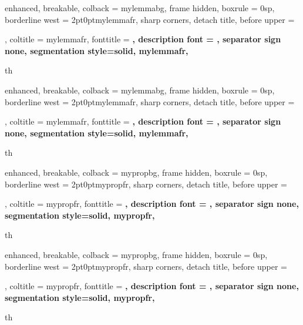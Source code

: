 

{%
	enhanced,
	breakable,
	colback = mylemmabg,
	frame hidden,
	boxrule = 0sp,
	borderline west = {2pt}{0pt}{mylemmafr},
	sharp corners,
	detach title,
	before upper = \tcbtitle \par \smallskip,
	coltitle = mylemmafr,
	fonttitle = \bfseries \sffamily,
	description font = \mdseries,
	separator sign none,
	segmentation style={solid, mylemmafr},
}
{th}

{%
	enhanced,
	breakable,
	colback = mylemmabg,
	frame hidden,
	boxrule = 0sp,
	borderline west = {2pt}{0pt}{mylemmafr},
	sharp corners,
	detach title,
	before upper = \tcbtitle \par \smallskip,
	coltitle = mylemmafr,
	fonttitle = \bfseries \sffamily,
	description font = \mdseries,
	separator sign none,
	segmentation style={solid, mylemmafr},
}
{th}



{%
	enhanced,
	breakable,
	colback = mypropbg,
	frame hidden,
	boxrule = 0sp,
	borderline west = {2pt}{0pt}{mypropfr},
	sharp corners,
	detach title,
	before upper = \tcbtitle \par \smallskip,
	coltitle = mypropfr,
	fonttitle = \bfseries \sffamily,
	description font = \mdseries,
	separator sign none,
	segmentation style={solid, mypropfr},
}
{th}

{%
	enhanced,
	breakable,
	colback = mypropbg,
	frame hidden,
	boxrule = 0sp,
	borderline west = {2pt}{0pt}{mypropfr},
	sharp corners,
	detach title,
	before upper = \tcbtitle \par \smallskip,
	coltitle = mypropfr,
	fonttitle = \bfseries \sffamily,
	description font = \mdseries,
	separator sign none,
	segmentation style={solid, mypropfr},
}
{th}


